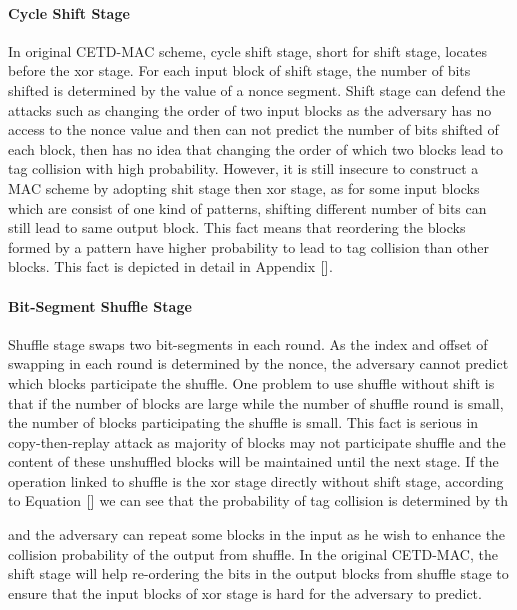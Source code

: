 \paragraph{Cycle Shift Stage}
In original CETD-MAC scheme, cycle shift stage, short for shift stage, locates before the xor stage. For each input block of shift stage, the number of bits shifted is determined by the value of a nonce segment. Shift stage can defend the attacks such as changing the order of two input blocks as the adversary has no access to the nonce value and then can not predict the number of bits shifted of each block, then has no idea that changing the order of which two blocks lead to tag collision with high probability. However, it is still insecure to construct a MAC scheme by adopting shit stage then xor stage, as for some input blocks which are consist of one kind of patterns, shifting different number of bits can still lead to same output block. This fact means that reordering the blocks formed by a pattern have higher probability to lead to tag collision than other blocks. This fact is depicted in detail in Appendix $\ref{}$. 

\paragraph{Bit-Segment Shuffle Stage}
Shuffle stage swaps two bit-segments in each round. As the index and offset of swapping in each round is determined by the nonce, the adversary cannot predict which blocks participate the shuffle. One problem to use shuffle without shift is that if the number of blocks are large while the number of shuffle round is small, the number of blocks participating the shuffle is small. This fact is serious in copy-then-replay attack as majority of blocks may not participate shuffle and the content of these unshuffled blocks will be maintained until the next stage. If the operation linked to shuffle is the xor stage directly without shift stage, according to Equation $\ref{}$ we can see that the probability of tag collision is determined by th

and the adversary can repeat some blocks in the input as he wish to enhance the collision probability of the output from shuffle.  In the original CETD-MAC, the shift stage will help re-ordering the bits in the output blocks from shuffle stage to ensure that the input blocks of xor stage is hard for the adversary to predict. 

